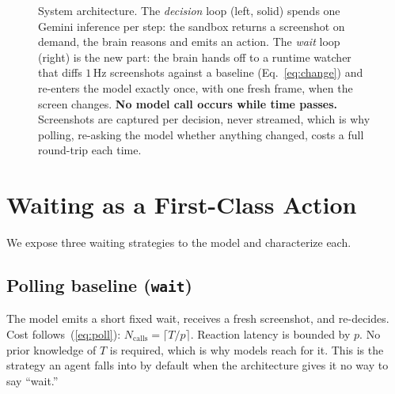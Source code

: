 \documentclass[conference]{IEEEtran}
\begin{document}
\begin{figure}[t]
{%
}
\caption{System architecture. The \emph{decision} loop (left, solid) spends one
Gemini inference per step: the sandbox returns a screenshot on demand, the brain
reasons and emits an action. The \emph{wait} loop (right) is the new part:
the brain hands off to a runtime watcher that diffs $1$\,Hz screenshots against a
baseline (Eq.~\ref{eq:change}) and re-enters the model exactly once, with one
fresh frame, when the screen changes. \textbf{No model call occurs while time
passes.} Screenshots are captured per decision, never streamed, which is why
polling, re-asking the model whether anything changed, costs a full round-trip
each time.}
\label{fig:arch}
\end{figure}

\section{Waiting as a First-Class Action}
\label{sec:waiting}

We expose three waiting strategies to the model and characterize each.

\subsection{Polling baseline (\texttt{wait})}
The model emits a short fixed wait, receives a fresh screenshot, and re-decides.
Cost follows~(\ref{eq:poll}): $N_{\text{calls}} = \lceil T/p \rceil$. Reaction
latency is bounded by $p$. No prior knowledge of $T$ is required, which is why
models reach for it. This is the strategy an agent falls into by default when the
architecture gives it no way to say ``wait.''
\end{document}
